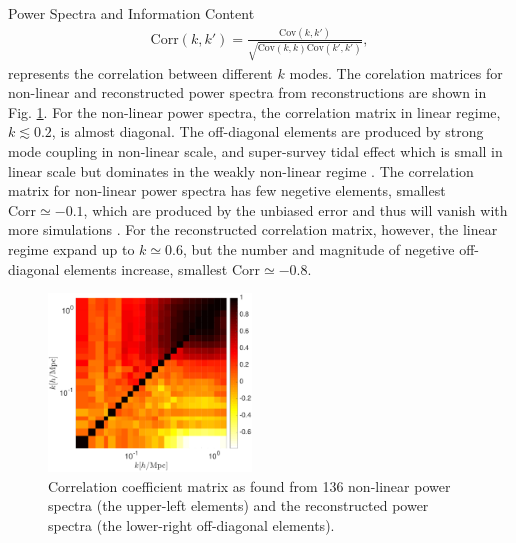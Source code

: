 \begin{section}{Power Spectra and Information Content}
\begin{align}
    \mathrm{Corr}\left(k,k'\right)=\frac{\mathrm{Cov}\left(k,k'\right)}{\sqrt{\mathrm{Cov}\left(k,k\right)\mathrm{Cov}\left(k',k'\right)}},
\end{align}
represents the correlation between different $k$ modes. 
The corelation matrices for non-linear and reconstructed power spectra from
reconstructions are shown in Fig. \ref{fig:corrall}. For the non-linear power spectra, the
correlation matrix in linear regime, $k \lesssim 0.2$, is almost diagonal. The off-diagonal elements are produced by 
strong mode coupling in non-linear scale, and super-survey tidal effect which is small in 
linear scale but dominates in the weakly non-linear regime \cite{bib:Kazuyuki2016}.
The correlation matrix for non-linear power spectra has few negetive elements,
 smallest $\mathrm{Corr} \simeq -0.1$, which are produced by the unbiased error and thus 
 will vanish with more simulations \cite{bib:Takahashi2009}.
 For the reconstructed correlation matrix, however, the linear regime expand up to $k \simeq 0.6$, 
but the number and magnitude of negetive off-diagonal elements increase, smallest $\mathrm{Corr} \simeq -0.8$. 

\begin{figure}
 \centering
  \includegraphics[width=0.48\textwidth]{corrmat_hot-crop.pdf}
  \caption{Correlation coefficient matrix as found from 136 non-linear power spectra 
(the upper-left elements) and the reconstructed power spectra (the lower-right off-diagonal elements).}
    \label{fig:corrall}
\end{figure}



\end{section}
